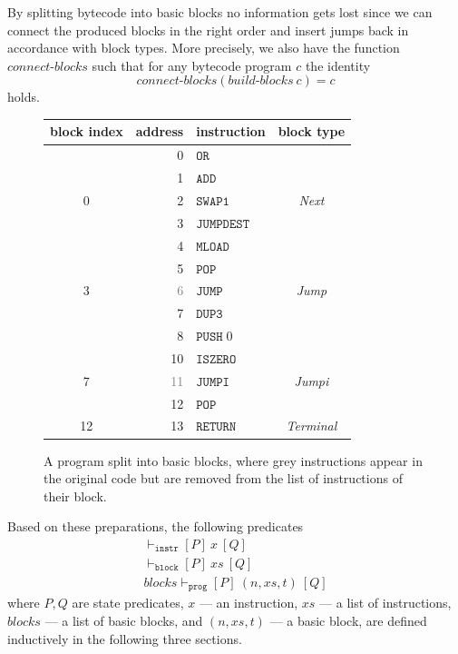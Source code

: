 \documentclass[sigplan,10pt,review]{acmart}\settopmatter{printfolios=true,printccs=false,printacmref=false}
\newcommand{\ttrip}[5]{\mathit{#1} \vdash_{\mathrm{#2}}[#3]\:#4\:[#5]}
\newcommand{\instr}[1]{\mathtt{#1}}
\newcommand{\bblocks}{\mathit{build\mbox{-}blocks}}
\newcommand{\cblocks}{\mathit{connect\mbox{-}blocks}}
\begin{document}
By splitting bytecode into basic blocks no information gets lost since we can connect the produced blocks
in the right order and insert jumps back in accordance with block types. More precisely, we also have the function
$\cblocks$ such that for any bytecode program $c$ the identity 
\[\cblocks(\bblocks\:c) = c\] holds.  
\begin{figure}
\center
\begin{tabular}{c r l c}
                block index & address & instruction & block type\\
                        \hline
                &       0       &       $\instr{OR}$&\\
                &       1       &       $\instr{ADD}$&\\
                {0}&    2       &       $\instr{SWAP1}$&  \textit{Next}\\
                        \hline
                &       3       &       $\instr{JUMPDEST}$&\\
                &       4       &       $\instr{MLOAD}$&\\
                &       5       &       $\instr{POP}$&\\
                {3}&    \textcolor{gray}{6}     &       {\color{gray}$\instr{JUMP}$}& \textit{Jump}\\
                        \hline
                &       7       &       $\instr{DUP3}$&\\
                &       8       &       $\instr{PUSH}\;0$&\\
                &       10      &       $\instr{ISZERO}$&\\
                {7}&    \textcolor{gray}{11}    &       {\color{gray}$\instr{JUMPI}$}& \textit{Jumpi}\\
                        \hline
                &       12      &       $\instr{POP}$&\\
                {12}&   13      &       $\instr{RETURN}$& \textit{Terminal}\\
                        \hline
        \end{tabular}
\caption{A program split into basic blocks, where grey instructions appear in the original
         code but are removed from the list of instructions of their block.}
\label{fig:basicblocks}
\end{figure}
%
Based on these preparations, the following predicates 
\[
\begin{array}{l}
\ttrip{}{\mathtt{instr}}{P}{\mathit{x}}{Q} \\
\ttrip{}{\mathtt{block}}{P}{\mathit{xs}}{Q} \\
\ttrip{\mathit{blocks}}{\mathtt{prog}}{P}{(n, \mathit{xs}, t)}{Q}
\end{array}
\]
where $P, Q$ are state predicates, $x$ --- an instruction, $\mathit{xs}$ --- a list of instructions,
$\mathit{blocks}$ --- a list of basic blocks, and
$(n, \mathit{xs}, t)$ --- a basic block, are defined inductively in the following three sections.
%
\end{document}
